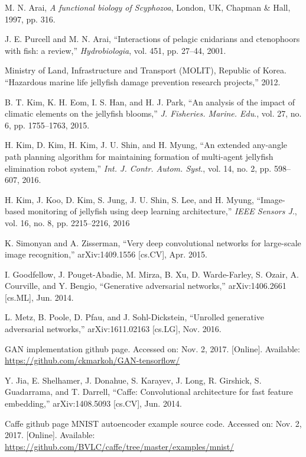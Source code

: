 \documentclass{ieeeaccess}
\begin{document}
\begin{thebibliography}{00}

 M. N. Arai, \textit{A functional biology of Scyphozoa}, London, UK, Chapman \& Hall, 1997, pp. 316.

 J. E. Purcell and M. N. Arai, ``Interactions of pelagic cnidarians and ctenophoors with fish: a review,'' \textit{Hydrobiologia}, vol. 451, pp. 27--44, 2001.

 Ministry of Land, Infrastructure and Transport (MOLIT), Republic of Korea. ``Hazardous marine life jellyfish damage prevention research projects,'' 2012.

 B. T. Kim, K. H. Eom, I. S. Han, and H. J. Park, ``An analysis of the impact of climatic elements on the jellyfish blooms,'' \textit{J. Fisheries. Marine. Edu}., vol. 27, no. 6, pp. 1755--1763, 2015.

 H. Kim, D. Kim, H. Kim, J. U. Shin, and H. Myung, ``An extended any-angle path planning algorithm for maintaining formation of multi-agent jellyfish elimination robot system,'' \textit{Int. J. Contr. Autom. Syst}., vol. 14, no. 2, pp. 598--607, 2016.

 H. Kim, J. Koo, D. Kim, S. Jung, J. U. Shin, S. Lee, and H. Myung, ``Image-based monitoring of jellyfish using deep learning architecture,'' \textit{IEEE Sensors J}., vol. 16, no. 8, pp. 2215--2216, 2016

 K. Simonyan and A. Zisserman, ``Very deep convolutional networks for large-scale image recognition,'' arXiv:1409.1556 [cs.CV], Apr. 2015.

 I. Goodfellow, J. Pouget-Abadie, M. Mirza, B. Xu, D. Warde-Farley, S. Ozair, A. Courville, and Y. Bengio, ``Generative adversarial networks,'' arXiv:1406.2661 [cs.ML], Jun. 2014.

 L. Metz, B. Poole, D. Pfau, and J. Sohl-Dickstein, ``Unrolled generative adversarial networks,'' arXiv:1611.02163 [cs.LG], Nov. 2016.

 GAN implementation github page. Accessed on: Nov. 2, 2017. [Online]. Available: \underline{https://github.com/ckmarkoh/GAN-tensorflow/}

 Y. Jia, E. Shelhamer, J. Donahue, S. Karayev, J. Long, R. Girshick, S. Guadarrama, and T. Darrell, ``Caffe: Convolutional architecture for fast feature embedding,''  arXiv:1408.5093 [cs.CV], Jun. 2014.

 Caffe github page MNIST autoencoder example source code. Accessed on: Nov. 2, 2017. [Online].  Available: \underline{https://github.com/BVLC/caffe/tree/master/examples/mnist/}


\end{thebibliography}
\end{document}
